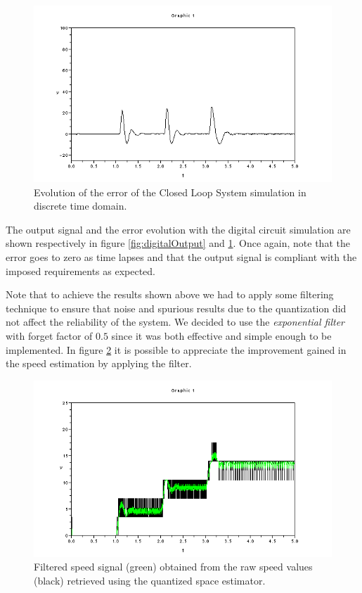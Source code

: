 \begin{figure}[htbp]
  \begin{center}
  \includegraphics[scale=0.5]{FIGURES_2/CLS-Error-Digital.png}
    \caption[Simulation in Discrete time]{Evolution of the error of the Closed Loop System simulation in discrete time domain.}
    \label{fig:digitalError}
  \end{center}
\end{figure}

The output signal and the error evolution with the digital circuit simulation are shown respectively in figure \ref{fig:digitalOutput} and \ref{fig:digitalError}. Once again, note that the error goes to zero as time lapses and that the output signal is compliant with the imposed requirements as expected.

Note that to achieve the results shown above we had to apply some filtering technique to ensure that noise and spurious results due to the quantization did not affect the reliability of the system. We decided to use the \textit{exponential filter} with forget factor of $0.5$ since it was both effective and simple enough to be implemented. In figure \ref{fig:digitalFilteredSpeed} it is possible to appreciate the improvement gained in the speed estimation by applying the filter.

\begin{figure}[htbp]
  \begin{center}
  \includegraphics[scale=0.5]{FIGURES_2/CLS-FilteredSpeed-Digital.png}
    \caption[Simulation in Discrete time]{Filtered speed signal (green) obtained from the raw speed values (black) retrieved using the quantized space estimator.}
    \label{fig:digitalFilteredSpeed}
  \end{center}
\end{figure}

